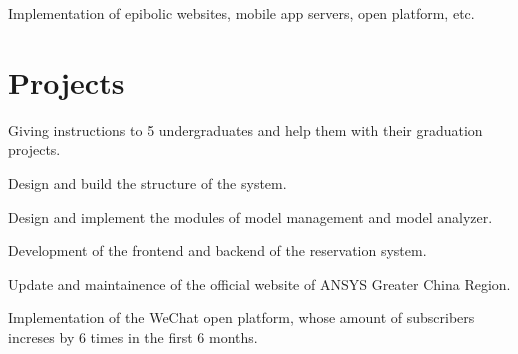 \documentclass[a4paper]{resume-en}
\begin{document}
\begin{minipage}[t]{0.72\textwidth}
\sectionspace


\begin{tightitemize}
\item Implementation of epibolic websites, mobile app servers,  open platform, etc.
\end{tightitemize}

\sectionspace


\section{Projects}

\begin{tightitemize}
\item Giving instructions to 5 undergraduates and help them with their graduation projects.
\item Design and build the structure of the system.
\item Design and implement the modules of model management and model analyzer.
\end{tightitemize}

\sectionspace


\begin{tightitemize}
\item Development of the frontend and backend of the reservation system.
\end{tightitemize}

\sectionspace


\begin{tightitemize}
\item Update and maintainence of the official website of ANSYS Greater China Region.
\item Implementation of the WeChat open platform, whose amount of subscribers increses by 6 times in the first 6 months.
\end{tightitemize}


\end{minipage}
\end{document}
